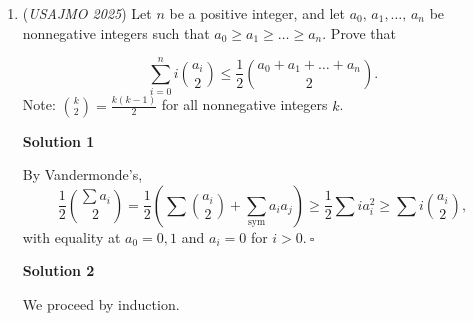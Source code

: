 \begin{enumerate}
 By Claims 1 and 2, the desired paths are exactly those with no turns at block centers.

 Now group the rows into $m$ strips of height $2$: strip $j$ consists of rows $y=2j$ and $y=2j+1$.For such a path $P$, let $r_{j,0}$ be the number of right-steps taken along $y=2j$,and let $r_{j,1}$ be the number of right-steps taken along $y=2j+1$.Avoiding block-center turns forces both $r_{j,0}$ and $r_{j,1}$ to be even. Write
 \[r_{j,0}=2a_j,\qquad r_{j,1}=2b_j\]with $a_j,b_j\ge 0$. Since $P$ has exactly $2n$ right-steps,
 \[\sum_{j=0}^{m-1}(2a_j+2b_j)=2n,\]so
 \[\sum_{j=0}^{m-1}a_j+\sum_{j=0}^{m-1}b_j=n.\]

 The sequence $(a_0,\dots,a_{m-1})$ uniquely encodes an up-right path from $(0,0)$ to $(n,m)$by taking $a_0$ right-steps, then an up-step, then $a_1$ right-steps, and so on.Similarly, $(b_0,\dots,b_{m-1})$ encodes another up-right path from $(0,0)$ to $(n,m)$.

 Conversely, given any ordered pair of up-right paths in an $m\times n$ grid,doubling every right-step and placing one path on even rows and the other on odd rowsproduces a unique up-right path in the $2m\times 2n$ grid with no block-center turns.Thus there is a bijection between the desired paths and ordered pairs of up-right pathsin an $m\times n$ grid.

 The number of up-right paths from $(0,0)$ to $(n,m)$ is $\binom{m+n}{m}$.Therefore the number of desired paths is $\binom{m+n}{m}^2$.

 


	\item (\textit{USAJMO 2025}) Let $n$ be a positive integer, and let $a_0,\,a_1,\dots,\,a_n$ be nonnegative integers such that $a_0\ge a_1\ge \dots\ge a_n.$ Prove that

 \[\sum_{i=0}^n i\binom{a_i}{2}\le\frac{1}{2}\binom{a_0+a_1+\dots+a_n}{2}.\]
Note: $\binom{k}{2}=\frac{k(k-1)}{2}$ for all nonnegative integers $k$.


 



\textbf{Solution 1}

By Vandermonde's,
 \[\frac 12\binom{\sum a_i}2=\frac 12\left(\sum\binom{a_i}2+\sum_\text{sym}a_ia_j\right)\ge\frac 12\sum ia_i^2\ge\sum i\binom{a_i}2,\]with equality at $a_0=0,1$ and $a_i=0$ for $i>0.~\square$




\textbf{Solution 2}

We proceed by induction.


\end{enumerate}
